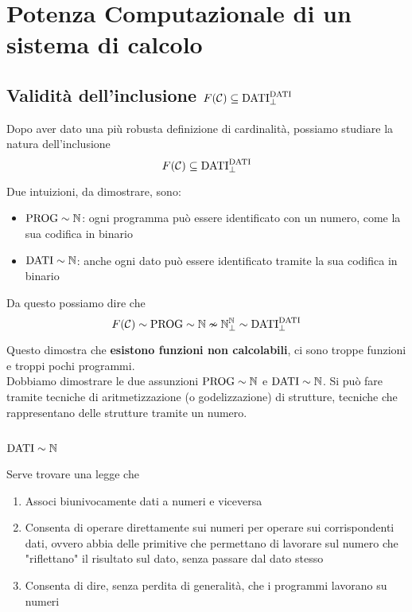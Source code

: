\section{Potenza Computazionale di un sistema di calcolo}
\subsection{Validità dell'inclusione $F(\mathcal{C}) \subseteq \text{DATI}_\bot^{\text{DATI}}$}

Dopo aver dato una più robusta definizione di cardinalità, possiamo studiare la natura dell'inclusione
$$ F(\mathcal{C}) \subseteq \text{DATI}_\bot^{\text{DATI}} $$

Due intuizioni, da dimostrare, sono: 
\begin{itemize}
	\item $\text{PROG} \sim \mathbb{N}$: ogni programma può essere identificato con un numero, come la sua codifica in binario
	\item $\text{DATI} \sim \mathbb{N}$: anche ogni dato può essere identificato tramite la sua codifica in binario
\end{itemize}

Da questo possiamo dire che
$$ F(\mathcal{C}) \sim \text{PROG} \sim \mathbb{N} \nsim \mathbb{N}_\bot^{\mathbb{N}} \sim \text{DATI}_\bot^{\text{DATI}} $$

Questo dimostra che \textbf{esistono funzioni non calcolabili}, ci sono troppe funzioni e troppi pochi programmi.\\

Dobbiamo dimostrare le due assunzioni $\text{PROG} \sim \mathbb{N}$ e $\text{DATI} \sim \mathbb{N}$. Si può fare tramite tecniche di aritmetizzazione (o godelizzazione) di strutture, tecniche che rappresentano delle strutture tramite un numero.

\subsection{$\text{DATI} \sim \mathbb{N}$}
Serve trovare una legge che
\begin{enumerate}
	\item Associ biunivocamente dati a numeri e viceversa
	\item Consenta di operare direttamente sui numeri per operare sui corrispondenti dati, ovvero abbia delle primitive che permettano di lavorare sul numero che "riflettano" il risultato sul dato, senza passare dal dato stesso
	\item Consenta di dire, senza perdita di generalità, che i programmi lavorano su numeri
\end{enumerate}

